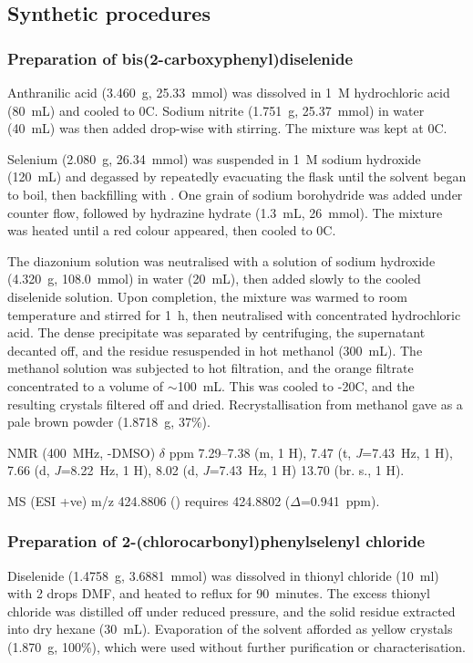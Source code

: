 \begin{refsection}
\subsection{Synthetic procedures}

\subsubsection[Preparation of \refcmpd{diselenide}]{Preparation of bis(2-carboxyphenyl)diselenide }
\label{sec:diselenide_prep}
Anthranilic acid (3.460~g, 25.33~mmol) was dissolved in 1~\textsc{M} hydrochloric acid (80~mL) and cooled to 0\degree C.
Sodium nitrite (1.751~g, 25.37~mmol) in water (40~mL) was then added drop-wise with stirring.
The mixture was kept at 0\degree C.

Selenium (2.080~g, 26.34~mmol) was suspended in 1~\textsc{M} sodium hydroxide (120~mL) and degassed by repeatedly evacuating the flask until the solvent began to boil, then backfilling with .
One grain of sodium borohydride was added under  counter flow, followed by hydrazine hydrate (1.3~mL, 26~mmol).
The mixture was heated until a red colour appeared, then cooled to 0\degree C.

The diazonium solution was neutralised with a solution of sodium hydroxide (4.320~g, 108.0~mmol) in water (20~mL), then added slowly to the cooled diselenide solution.
Upon completion, the mixture was warmed to room temperature and stirred for 1~h, then neutralised with concentrated hydrochloric acid.
The dense precipitate was separated by centrifuging, the supernatant decanted off, and the residue resuspended in hot methanol (300~mL).
The methanol solution was subjected to hot filtration, and the orange filtrate concentrated to a volume of $\sim$100~mL.
This was cooled to -20\degree C, and the resulting crystals filtered off and dried.
Recrystallisation from methanol gave  as a pale brown powder (1.8718~g, 37\%).

{\footnotesize

 NMR (400~MHz, -DMSO) $\delta$ ppm
7.29--7.38 (m, 1 H),
7.47 (t, \emph{J}=7.43~Hz, 1 H),
7.66 (d, \emph{J}=8.22~Hz, 1 H),
8.02 (d, \emph{J}=7.43~Hz, 1 H)
13.70 (br. s., 1 H).

MS (ESI +ve) m/z 424.8806 ()  requires 424.8802 ($\Delta$=0.941~ppm).
}

\subsubsection[Preparation of \refcmpd{dichloride}]{Preparation of 2-(chlorocarbonyl)phenylselenyl chloride }
Diselenide  (1.4758~g, 3.6881~mmol) was dissolved in thionyl chloride (10~ml) with 2 drops DMF, and heated to reflux for 90~minutes.
The excess thionyl chloride was distilled off under reduced pressure, and the solid residue extracted into dry hexane (30~mL).
Evaporation of the solvent afforded  as yellow crystals (1.870~g, 100\%), which were used without further purification or characterisation.


\end{refsection}
